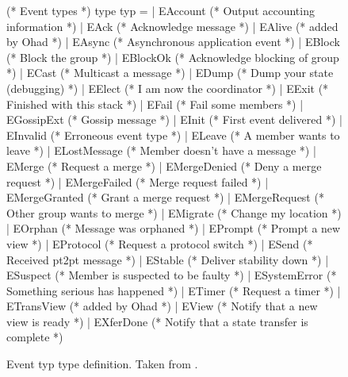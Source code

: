 \begin{figure}
\begin{codebox}

  (* Event types *)
type typ =
  | EAccount				(* Output accounting information *)
  | EAck				(* Acknowledge message *)
  | EAlive				(* added by Ohad *)
  | EAsync				(* Asynchronous application event *)
  | EBlock				(* Block the group *)
  | EBlockOk				(* Acknowledge blocking of group *)
  | ECast				(* Multicast a message *)
  | EDump				(* Dump your state (debugging) *)
  | EElect				(* I am now the coordinator *)
  | EExit				(* Finished with this stack *)
  | EFail				(* Fail some members *)
  | EGossipExt				(* Gossip message *)
  | EInit				(* First event delivered *)
  | EInvalid				(* Erroneous event type *)
  | ELeave				(* A member wants to leave *)
  | ELostMessage			(* Member doesn't have a message *)
  | EMerge				(* Request a merge *)
  | EMergeDenied			(* Deny a merge request *)
  | EMergeFailed			(* Merge request failed *)
  | EMergeGranted			(* Grant a merge request *)
  | EMergeRequest			(* Other group wants to merge *)
  | EMigrate				(* Change my location *)
  | EOrphan				(* Message was orphaned *)
  | EPrompt				(* Prompt a new view *)
  | EProtocol				(* Request a protocol switch *)
  | ESend				(* Received pt2pt message *)
  | EStable				(* Deliver stability down *)
  | ESuspect				(* Member is suspected to be faulty *)
  | ESystemError			(* Something serious has happened *)
  | ETimer				(* Request a timer *)
  | ETransView				(* added by Ohad *)
  | EView				(* Notify that a new view is ready *)
  | EXferDone				(* Notify that a state transfer is complete *)
\end{codebox}
\caption{Event typ type definition.  Taken from .}
\label{fig:upenum}
\end{figure}

